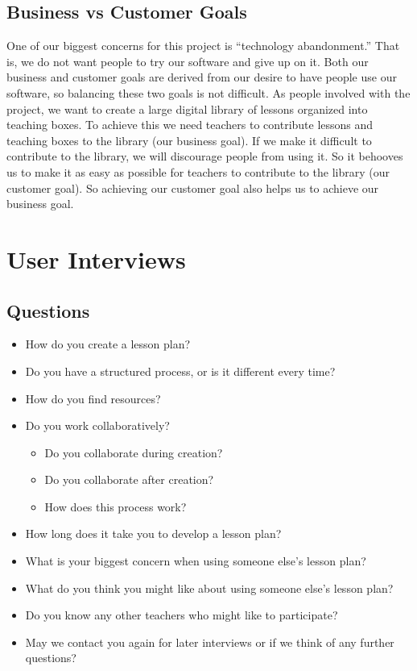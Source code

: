 \documentclass[10pt,letter,titlepage]{article}
\begin{document}
\subsection{Business vs Customer Goals}
One of our biggest concerns for this project is ``technology abandonment.'' That
is, we do not want people to try our software and give up on it. Both our
business and customer goals are derived from our desire to have people use our
software, so balancing these two goals is not difficult. As people involved with
the project, we want to create a large digital library of lessons organized into
teaching boxes. To achieve this we need teachers to contribute lessons and
teaching boxes to the library (our business goal). If we make it difficult to
contribute to the library, we will discourage people from using it. So it
behooves us to make it as easy as possible for teachers to contribute to the
library (our customer goal). So achieving our customer goal also helps us to
achieve our business goal.

\pagebreak
\appendix

\section{User Interviews}

\subsection{Questions}
\label{interview questions}
\begin{itemize}
	\item How do you create a lesson plan?

	\item Do you have a structured process, or is it different every time?

	\item How do you find resources?

	\item Do you work collaboratively?
	\begin{itemize}
		\item Do you collaborate during creation?

		\item Do you collaborate after creation?

		\item How does this process work?
	\end{itemize}

	\item How long does it take you to develop a lesson plan?

	\item What is your biggest concern when using someone else's lesson plan?

	\item What do you think you might like about using someone else's lesson
		plan?

	\item Do you know any other teachers who might like to participate?

	\item May we contact you again for later interviews or if we think of any
		further questions?
\end{itemize}
\end{document}
